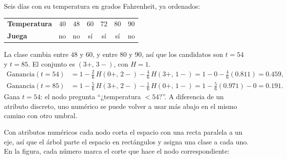 \documentclass[11pt,letterpaper]{article}
\begin{document}
\begin{ejemplo}
    Seis días con su temperatura en grados Fahrenheit, ya ordenados:
    \begin{center}
    \small
    \begin{tabular}{lcccccc}
        \toprule
        \textbf{Temperatura} & $40$ & $48$ & $60$ & $72$ & $80$ & $90$ \\
        \textbf{Juega}       & no & no & sí & sí & sí & no \\
        \bottomrule
    \end{tabular}
    \end{center}
    La clase cambia entre $48$ y $60$, y entre $80$ y $90$, así que
    los candidatos son $t = 54$ y $t = 85$. El conjunto es
    $(3+,\,3-)$, con $H = 1$.
    \begin{align*}
        \text{Ganancia}(t = 54)
            &= 1 - \tfrac{2}{6}\,H(0+,\,2-) - \tfrac{4}{6}\,H(3+,\,1-)
             = 1 - 0 - \tfrac{4}{6}(0.811) = 0.459 , \\
        \text{Ganancia}(t = 85)
            &= 1 - \tfrac{5}{6}\,H(3+,\,2-) - \tfrac{1}{6}\,H(0+,\,1-)
             = 1 - \tfrac{5}{6}(0.971) - 0 = 0.191 .
    \end{align*}
    Gana $t = 54$: el nodo pregunta ``¿temperatura $< 54$?''. A
    diferencia de un atributo discreto, uno numérico se puede volver a
    usar más abajo en el mismo camino con otro umbral.
\end{ejemplo}

Con atributos numéricos cada nodo corta el espacio con una recta
paralela a un eje, así que el árbol parte el espacio en rectángulos y
asigna una clase a cada uno. En la figura, cada número marca el corte
que hace el nodo correspondiente:
\end{document}
